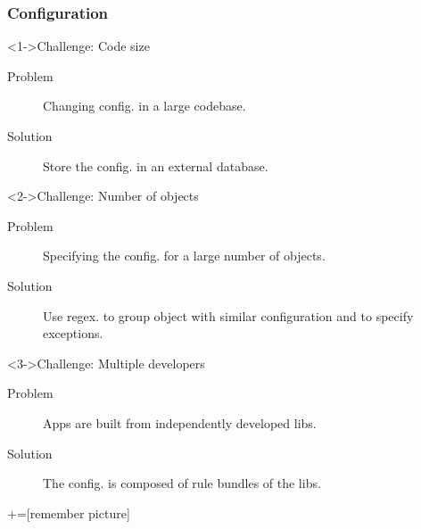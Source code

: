 \documentclass[]{prezentare}
\begin{document}

\begin{frame}
	\frametitle{Configuration}
	\begin{block}<1->{Challenge: Code size}
	\begin{description}
	\item [Problem]	Changing config. in a large codebase.
	\item [Solution] Store the config. in an external database.
	\end{description}
	\end{block}
	
	\begin{block}<2->{Challenge: Number of objects}
	\begin{description}
	\item [Problem] Specifying the config. for a large number of objects.
	\item [Solution] Use regex. to group object with similar configuration and to specify exceptions.
	\end{description}
	\end{block}
	
	\begin{block}<3->{Challenge: Multiple developers}
	\begin{description}
	\item [Problem] Apps are built from independently developed libs.
	\item [Solution] The config. is composed of rule bundles of the libs.
	\end{description}
	\end{block}
\end{frame}

+=[remember picture]
\end{document}
